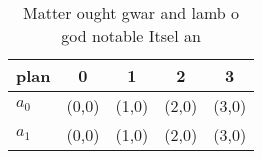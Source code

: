 \documentclass[a4paper]{article}
\begin{document}
\begin{table}
\begin{adjustbox}{width=0.7\columnwidth}
\begin{tabular}{|l|l|l|l|l|}
\hline
\textbf{plan} & \multicolumn{1}{c|}{\textbf{0}} & \multicolumn{1}{c|}{\textbf{1}} & \multicolumn{1}{c|}{\textbf{2}} & \multicolumn{1}{c|}{\textbf{3}} \\ \hline
\textbf{$a_0$}  & (0,0) & (1,0) & (2,0) & (3,0) \\ \hline
\textbf{$a_1$}  & (0,0) & (1,0) & (2,0) & (3,0) \\ \hline
\end{tabular}
\end{adjustbox}
\caption{Matter ought gwar and lamb o god notable Itsel an
}
\end{table}
\end{document}
